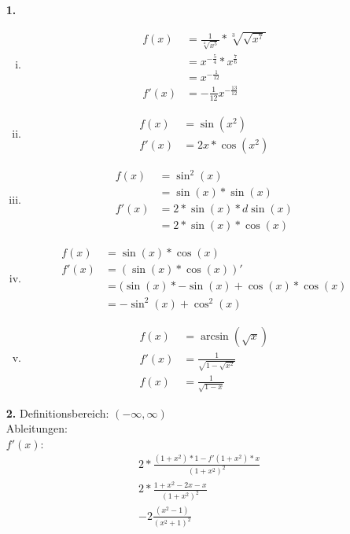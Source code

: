 \documentclass[a4paper]{scrartcl}
\title{\titleinfo}
\author{Elena Noll, Sven-Hendrik Haase, Arne Struck}
\date{\today}
\begin{document}
\maketitle

\begin{enumerate}

\item[\textbf{1.}]
\begin{enumerate}[(i)]

\item
\begin{align}
f(x) &= \frac{1}{\sqrt[4]{x^5}} * \sqrt[3]{\sqrt{x^7}} \\
&= x^{-\frac{5}{4}} * x^{\frac{7}{6}}\\
&= x^{-\frac{1}{12}}\\  	 
f'(x) &= -\frac{1}{12} x^{-\frac{13}{12}}
\end{align}
\item
\begin{align}
f(x) &= \sin(x^2) \\
f'(x)&= 2x*\cos(x^2)
\end{align}
\item
\begin{align}
f(x) &= \sin^2(x) \\
&= \sin(x)*\sin(x) \\
f'(x) &= 2*\sin(x)*d \sin(x)\\
&= 2*\sin(x)*\cos(x)
\end{align}
\item
\begin{align}
f(x) &= \sin(x)*\cos(x)\\
f'(x) &= (\sin(x)*\cos(x))'\\
&= (\sin(x)*-\sin(x)+\cos(x)*\cos(x)\\
&= -\sin^2(x)+\cos^2(x)
\end{align}
\item
\begin{align}
f(x) &= \arcsin(\sqrt{x}) \\
f'(x) &= \frac{1}{\sqrt{1-\sqrt{x^2}}} \\
f(x) &= \frac{1}{\sqrt{1-x}}
\end{align}
\end{enumerate}


\item[\textbf{2.}]
Definitionsbereich: \((-\infty,\infty)\)\\
Ableitungen:\\

\(f'(x)\):
\begin{align}
&2*\frac {(1+x^2)*1-f'(1+x^2)*x} {(1+x^2)^2}\\
&2*\frac {1+x^2-2x-x} {(1+x^2)^2}\\
&-2\frac {(x^2-1)} {(x^2+1)^2}
\end{align}


\end{enumerate}
\end{document}

